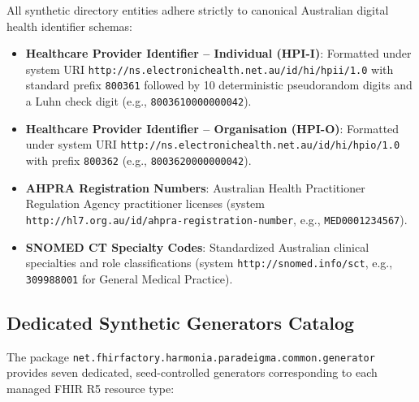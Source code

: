 All synthetic directory entities adhere strictly to canonical Australian digital health identifier schemas:
\begin{itemize}
    \item \textbf{Healthcare Provider Identifier -- Individual (HPI-I)}: Formatted under system URI \texttt{http://ns.electronichealth.net.au/id/hi/hpii/1.0} with standard prefix \texttt{800361} followed by 10 deterministic pseudorandom digits and a Luhn check digit (e.g., \texttt{8003610000000042}).
    \item \textbf{Healthcare Provider Identifier -- Organisation (HPI-O)}: Formatted under system URI \texttt{http://ns.electronichealth.net.au/id/hi/hpio/1.0} with prefix \texttt{800362} (e.g., \texttt{8003620000000042}).
    \item \textbf{AHPRA Registration Numbers}: Australian Health Practitioner Regulation Agency practitioner licenses (system \texttt{http://hl7.org.au/id/ahpra-registration-number}, e.g., \texttt{MED0001234567}).
    \item \textbf{SNOMED CT Specialty Codes}: Standardized Australian clinical specialties and role classifications (system \texttt{http://snomed.info/sct}, e.g., \texttt{309988001} for General Medical Practice).
\end{itemize}

\subsection{Dedicated Synthetic Generators Catalog}

The package \texttt{net.fhirfactory.harmonia.paradeigma.common.generator} provides seven dedicated, seed-controlled generators corresponding to each managed FHIR R5 resource type:

